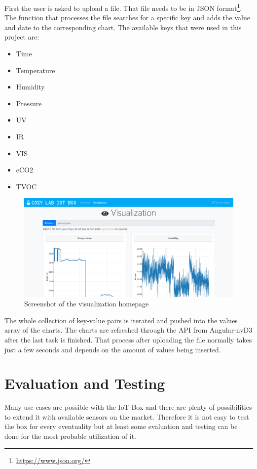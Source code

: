 \documentclass[bachelorthesis, grey, english]{mas-thesis-chapters} %
\begin{document}
First the user is asked to upload a file. That file needs to be in \gls{JSON} format\footnote{\url{https://www.json.org/}}. The function that processes the file searches for a specific key and adds the value and date to the corresponding chart. The available keys that were used in this project are:

\begin{itemize}
  \setlength\itemsep{0em}
  \item Time
  \item Temperature
  \item Humidity
  \item Pressure
  \item UV
  \item IR
  \item VIS
  \item eCO2
  \item TVOC
\end{itemize}

\begin{figure}[ht]
	\centering
	\includegraphics[width=13.5cm]{Website_Mockup.pdf}
	\caption{Screenshot of the visualization homepage}
	\label{fig:homepage}
\end{figure}

The whole collection of key-value pairs is iterated and pushed into the values array of the charts. The charts are refreshed through the \gls{API} from Angular-nvD3 after the last task is finished. That process after uploading the file normally takes just a few seconds and depends on the amount of values being inserted.

\section{Evaluation	and	Testing}

Many use cases are possible with the \gls{IoT}-Box and there are plenty of possibilities to extend it with available sensors on the market. Therefore it is not easy to test the box for every eventuality but at least some evaluation and testing can be done for the most probable utilization of it.
\end{document}
